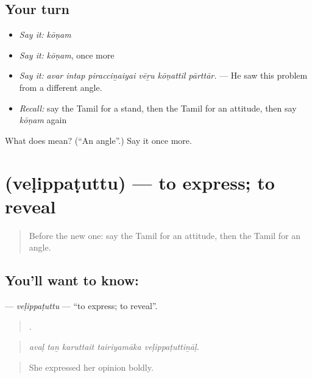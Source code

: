 \subsection*{Your turn}
\begin{itemize}
\raggedright
  \item \emph{Say it:} \emph{kōṇam}
  \item \emph{Say it:} \emph{kōṇam}, once more
  \item \emph{Say it:} \emph{avar intap piracciṉaiyai vēṟu kōṇattil pārttār.} — He saw this problem from a different angle.
  \item \emph{Recall:} say the Tamil for a stand, then the Tamil for an attitude, then say \emph{kōṇam} again
\end{itemize}

\begin{tcolorbox}[breakable,colback=teal!4,colframe=teal!35!black,title={Before you move on}]
What does  mean? (\textquotedblleft{}An angle\textquotedblright{}.) Say it once more.
\end{tcolorbox}
\section[\texorpdfstring{\ta{வெளிப்படுத்து} (veḷippaṭuttu)}{வெளிப்படுத்து (veḷippaṭuttu)}]{ (veḷippaṭuttu) — to express; to reveal}

\label{lesson:TA-C350-velippatuttu}



\begin{quote}
Before the new one: say the Tamil for an attitude, then the Tamil for an angle.
\end{quote}

\subsection*{You'll want to know: }
\textbf{} — \emph{veḷippaṭuttu} — \textquotedblleft{}to express; to reveal\textquotedblright{}.

\begin{quote}
    .
\end{quote}

\begin{quote}
\emph{avaḷ taṉ karuttait tairiyamāka veḷippaṭuttiṉāḷ.}
\end{quote}

\begin{quote}
She expressed her opinion boldly.
\end{quote}

